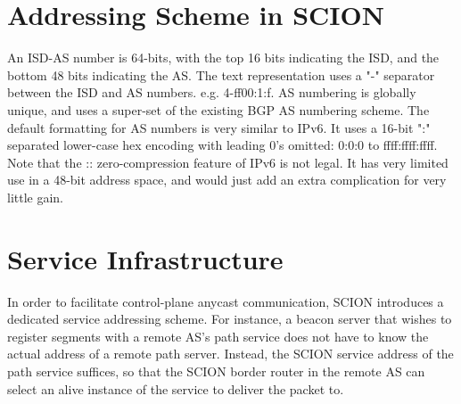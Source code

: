 
\section{Addressing Scheme in SCION} \label{addr_scheme}
An ISD-AS number is 64-bits, with the top 16 bits indicating the ISD, and the bottom 48 bits indicating the AS. The text representation uses a "-" separator between the ISD and AS numbers. e.g. 4-ff00:1:f. AS numbering is globally unique, and uses a super-set of the existing BGP AS numbering scheme. The default formatting for AS numbers is very similar to IPv6. It uses a 16-bit ":" separated lower-case hex encoding with leading 0's omitted: 0:0:0 to ffff:ffff:ffff. Note that the :: zero-compression feature of IPv6 is not legal. It has very limited use in a 48-bit address space, and would just add an extra complication for very little gain.

\section{Service Infrastructure} \label{serv_infra}
In order to facilitate control-plane anycast communication, SCION introduces a dedicated service addressing scheme. For instance, a beacon server that wishes to register segments with a remote AS's path service does not have to know the actual address of a remote path server. Instead, the SCION service address of the path service suffices, so that the SCION border router in the remote AS can select an alive instance of the service to deliver the packet to.

